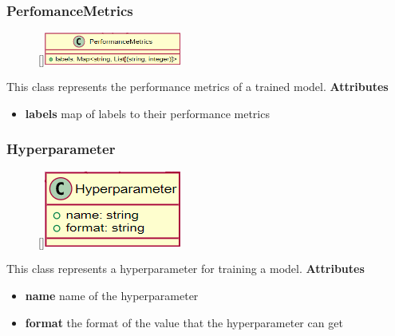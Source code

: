 \subsubsection{PerfomanceMetrics}
\label{PerformanceMetrics}
\begin{figure}
    \raisebox{0pt}[\dimexpr{}\baselineskip\relax]{\includegraphics[width=4.5cm]{classes/model-management/12.png}}
\end{figure} 
\par
This class represents the performance metrics of a trained model.
\newline
\newline
\textbf{Attributes}
\begin{itemize}
    \item \textbf{labels} map of labels to their performance metrics
\end{itemize}

\subsubsection{Hyperparameter}
\label{Hyperparameter}
\begin{figure}
    \raisebox{0pt}[\dimexpr{}\baselineskip\relax]{\includegraphics[width=4.5cm]{classes/model-management/13.png}}
\end{figure} 
\par
This class represents a hyperparameter for training a model.
\newline
\newline
\textbf{Attributes}
\begin{itemize}
    \item \textbf{name} name of the hyperparameter
    \item \textbf{format} the format of the value that the hyperparameter can get
\end{itemize}

